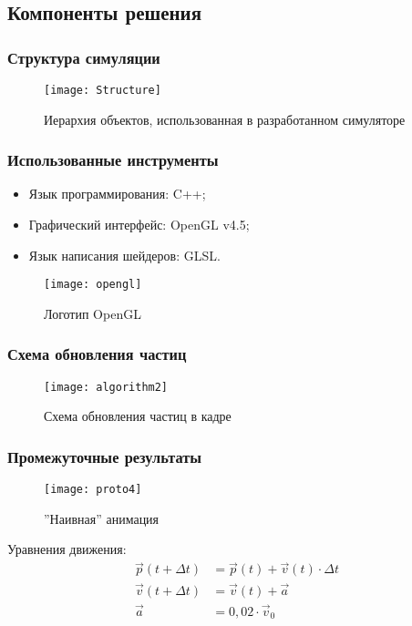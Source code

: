 \subsection{Компоненты решения}
\begin{frame}
\frametitle{Структура симуляции}
\begin{figure}[htb]
	\centering
	\texttt{[image: Structure]}
    \caption{Иерархия объектов, использованная в разработанном симуляторе}%
    \label{fig:simStructure}
\end{figure}
\end{frame}

\begin{frame}
\frametitle{Использованные инструменты}
\begin{itemize}
    \item Язык программирования: C++;
    \item Графический интерфейс: OpenGL v4.5;
    \item Язык написания шейдеров: GLSL.
\end{itemize}
\begin{figure}
	\centering
    \texttt{[image: opengl]}
    \caption{Логотип OpenGL}%
    \label{fig:opengl}
\end{figure}
\end{frame}

\begin{frame}
\frametitle{Схема обновления частиц}
\begin{figure}
	\centering
	\texttt{[image: algorithm2]}
    \caption{Схема обновления частиц в кадре}%
    \label{fig:algorithm}
\end{figure}
\end{frame}

\begin{frame}
\frametitle{Промежуточные результаты}
\begin{wrapfigure}{r}{0.4\textwidth}
	\centering
    \texttt{[image: proto4]}
    \caption{''Наивная'' анимация}%
    \label{fig:proto4}
\end{wrapfigure}

Уравнения движения:
\begin{align}
  \label{eq:position}
  \vec{p}(t + \Delta{t}) &= \vec{p}(t) + \vec{v}(t) \cdot \Delta{t} \\
  \label{eq:velocity}
  \vec{v}(t + \Delta{t}) &= \vec{v}(t) + \vec{a} \\
  \label{eq:accelearation}
  \vec{a} &= 0,02 \cdot \vec{v}_{0}
\end{align}
\end{frame}

